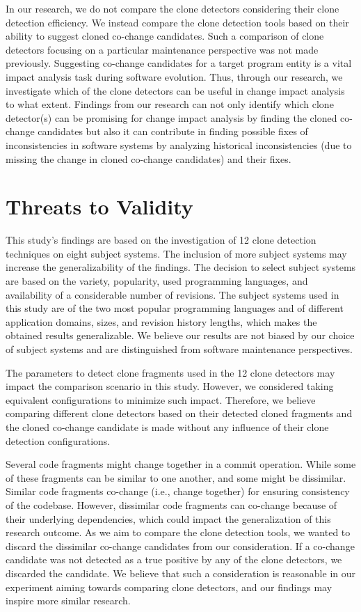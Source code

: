 \documentclass[review]{elsarticle}
\begin{document}
In our research, we do not compare the clone detectors considering their clone detection efficiency. We instead compare the clone detection tools based on their ability to suggest cloned co-change candidates. Such a comparison of clone detectors focusing on a particular maintenance perspective was not made previously. Suggesting co-change candidates for a target program entity is a vital impact analysis \cite{book-change-impact} task during software evolution. Thus, through our research, we investigate which of the clone detectors can be useful in change impact analysis to what extent. Findings from our research can not only identify which clone detector(s) can be promising for change impact analysis by finding the cloned co-change candidates but also it can contribute in finding possible fixes of inconsistencies in software systems by analyzing historical inconsistencies (due to missing the change in cloned co-change candidates) and their fixes.  

\section{Threats to Validity}
\label{the-threat-validity}
This study's findings are based on the investigation of 12 clone detection techniques on eight subject systems. The inclusion of more subject systems may increase the generalizability of the findings. The decision to select subject systems are based on the variety, popularity, used programming languages, and availability of a considerable number of revisions. The subject systems used in this study are of the two most popular programming languages and of different application domains, sizes, and revision history lengths, which makes the obtained results generalizable. We believe our results are not biased by our choice of subject systems and are distinguished from software maintenance perspectives.

The parameters to detect clone fragments used in the 12 clone detectors may impact the comparison scenario in this study. However, we considered taking equivalent configurations to minimize such impact. Therefore, we believe comparing different clone detectors based on their detected cloned fragments and the cloned co-change candidate is made without any influence of their clone detection configurations. 

Several code fragments might change together in a commit operation. While some of these fragments can be similar to one another, and some might be dissimilar. Similar code fragments co-change (i.e., change together) for ensuring consistency of the codebase. However, dissimilar code fragments can co-change because of their underlying dependencies, which could impact the generalization of this research outcome. As we aim to compare the clone detection tools, we wanted to discard the dissimilar co-change candidates from our consideration. If a co-change candidate was not detected as a true positive by any of the clone detectors, we discarded the candidate. We believe that such a consideration is reasonable in our experiment aiming towards comparing clone detectors, and our findings may inspire more similar research.
\end{document}
